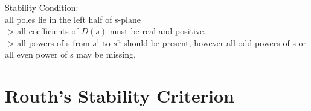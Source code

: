 Stability Condition:\\

all poles lie in the left half of s-plane\\

-> all coefficients of $D(s)$ must be real and positive.\\

-> all powers of s from $s^1$ to $s^n$ should be present, however all odd powers of s or all even power of s may be missing.\\

\section{Routh's Stability Criterion}
